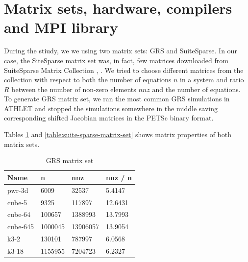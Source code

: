 \section{Matrix sets, hardware, compilers and MPI library} \label{subseq:matrix-sets-and-hardware}


During the stiudy, we we using two matrix sets: GRS and SuiteSparse. In our case, the SiteSparse matrix set was, in fact, few matrices downloaded from SuiteSparse Matrix Collection \cite{sparse-matrix-collection:1}, \cite{sparse-matrix-collection:2}. We tried to choose different matrices from the collection with respect to both the number of equations $n$ in a system and ratio $R$ between the number of non-zero elements $nnz$ and the number of equations.\\ 


To generate GRS matrix set, we ran the most common GRS simulations in ATHLET and stopped the simulations somewhere in the middle saving corresponding shifted Jacobian matrices in the PETSc binary format.\\

Tables \ref{table:grs-matrix-set}  and \ref{table:suite-sparse-matrix-set} shows matrix properties of both matrix sets.\\

\begin{table}[ht]
\centering
\begin{tabular}{|l|l|l|l|}
\hline
Name     & n       & nnz      & nnz / n \\ \hline
pwr-3d   & 6009    & 32537   & 5.4147 \\ \hline
cube-5   & 9325    & 117897   & 12.6431  \\ \hline
cube-64  & 100657  & 1388993  & 13.7993 \\ \hline
cube-645 & 1000045 & 13906057 & 13.9054 \\ \hline
k3-2     & 130101  & 787997   & 6.0568  \\ \hline
k3-18    & 1155955 & 7204723  & 6.2327  \\ \hline
\end{tabular}
\caption{GRS matrix set}
\label{table:grs-matrix-set}
\end{table}



